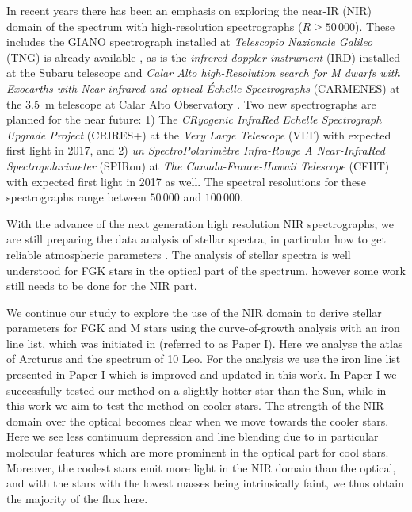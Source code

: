 \documentclass{aa}
\begin{document}
{In recent years there has been an emphasis on exploring the near-IR (NIR) domain of the spectrum
with high-resolution spectrographs ($R\ge50\,000$). These includes the GIANO spectrograph installed
at \emph{Telescopio Nazionale Galileo} (TNG) is already available \citep{GIANO}, as is the
\emph{infrered doppler instrument} (IRD) installed at the Subaru telescope \citep{IRD} and
\emph{Calar Alto high-Resolution search for M dwarfs with Exoearths with Near-infrared and optical
Échelle Spectrographs} (CARMENES) at the \SI{3.5}{m} telescope at Calar Alto Observatory
\citep{CARMENES}. Two new spectrographs are planned for the near future: 1) The \emph{CRyogenic
InfraRed Echelle Spectrograph Upgrade Project} (CRIRES+) at the \emph{Very Large Telescope} (VLT)
\citep{CRIRESp} with expected first light in 2017, and 2) \emph{un SpectroPolarimètre Infra-Rouge A
Near-InfraRed Spectropolarimeter} (SPIRou) at \emph{The Canada-France-Hawaii Telescope} (CFHT)
\citep{SPIROU1,SPIROU2} with expected first light in 2017 as well. The spectral resolutions for
these spectrographs range between $50\,000$ and $100\,000$.

With the advance of the next generation high resolution NIR spectrographs, we are still preparing
the data analysis of stellar spectra, in particular how to get reliable atmospheric parameters
\citep[see e.g.][]{Onehag2012,Lindgren2016,Andreasen2016,Passegger2016}. The analysis of stellar
spectra is well understood for FGK stars in the optical part of the spectrum, however some work
still needs to be done for the NIR part.

We continue our study to explore the use of the NIR domain to derive stellar parameters for FGK and
M stars using the curve-of-growth analysis with an iron line list, which was initiated in
\citet{Andreasen2016} (referred to as Paper I). Here we analyse the atlas of Arcturus and the
spectrum of 10 Leo. For the analysis we use the iron line list presented in Paper I which is
improved and updated in this work. In Paper I we successfully tested our method on a slightly hotter
star than the Sun, while in this work we aim to test the method on cooler stars. The strength of the
NIR domain over the optical becomes clear when we move towards the cooler stars. Here we see less
continuum depression and line blending due to in particular molecular features which are more
prominent in the optical part for cool stars. Moreover, the coolest stars emit more light in the NIR
domain than the optical, and with the stars with the lowest masses being intrinsically faint, we
thus obtain the majority of the flux here.
}
\end{document}
